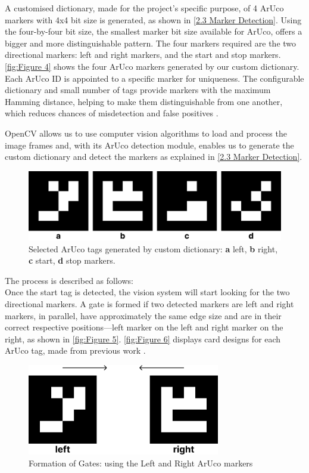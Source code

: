 \documentclass[12pt,a4paper]{report}
\def\aruco{ArUco }
\begin{document}
A customised dictionary, made for the project's specific purpose, of 4 \aruco markers with 4x4 bit size is generated, as shown in \autoref{2.3 Marker Detection}. Using the four-by-four bit size, the smallest marker bit size available for ArUco, offers a bigger and more distinguishable pattern. The four markers required are the two directional markers: left and right markers, and the start and stop markers.
\autoref{fig:Figure 4} shows the four \aruco markers generated by our custom dictionary. Each \aruco ID is appointed to a specific marker for uniqueness. The configurable dictionary and small number of tags provide markers with the maximum Hamming distance, helping to make them distinguishable from one another, which reduces chances of misdetection and false positives \cite{FMforposeestimation}.

OpenCV allows us to use computer vision algorithms to load and process the image frames and, with its \aruco detection module, enables us to generate the custom dictionary and detect the markers as explained in \autoref{2.3 Marker Detection}.

\begin{figure}[h]
    \centering
    \includegraphics[width=1\textwidth]{Images/ArUco tags hori.png}
    \caption[Selected \aruco tags]{Selected \aruco tags generated by custom dictionary: \textbf{a} left, \textbf{b} right, \textbf{c} start, \textbf{d} stop markers.}
    \label{fig:Figure 4}
\end{figure}

The process is described as follows:\\
Once the start tag is detected, the vision system will start looking for the two directional markers. A gate is formed if two detected markers are left and right markers, in parallel, have approximately the same edge size and are in their correct respective positions---left marker on the left and right marker on the right, as shown in \autoref{fig:Figure 5}. \autoref{fig:Figure 6} displays card designs for each \aruco tag, made from previous work \cite{elias}.

\begin{figure}[h]
    \centering
    \includegraphics[width=0.75\textwidth]{Images/Gate Formation.png}
    \caption[Formation of Gates]{Formation of Gates: using the Left and Right \aruco markers}
    \label{fig:Figure 5}
\end{figure}
\end{document}
